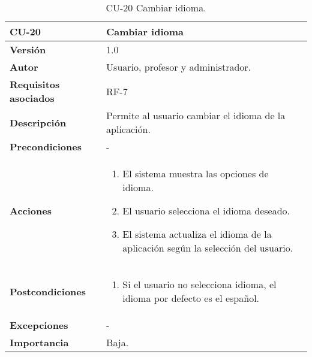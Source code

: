 \begin{table}[h!]
	\centering
	\begin{tabularx}{\linewidth}{ p{} p{} }
		\toprule
		\textbf{CU-20}    & \textbf{Cambiar idioma}\\
		\toprule
		\textbf{Versión}              & 1.0    \\
		\textbf{Autor}                & Usuario, profesor y administrador. \\
		\textbf{Requisitos asociados} & RF-7\\
		\textbf{Descripción}          & Permite al usuario cambiar el idioma de la aplicación. \\
		\textbf{Precondiciones}         & - \\
		\textbf{Acciones}             &
		\begin{enumerate}
			\def\labelenumi{\arabic{enumi}.}
			\tightlist
			\item El sistema muestra las opciones de idioma.
			\item El usuario selecciona el idioma deseado.
            \item El sistema actualiza el idioma de la aplicación según la selección del usuario.
		\end{enumerate}\\
         \textbf{Postcondiciones}             &
		\begin{enumerate}
			\def\labelenumi{\arabic{enumi}.}
			\tightlist
			\item Si el usuario no selecciona idioma, el idioma por defecto es el español.
		\end{enumerate}\\
		\textbf{Excepciones}             & - \\
		\textbf{Importancia}          & Baja. \\
		\bottomrule
	\end{tabularx}
	\caption{CU-20  Cambiar idioma.}
\end{table}

